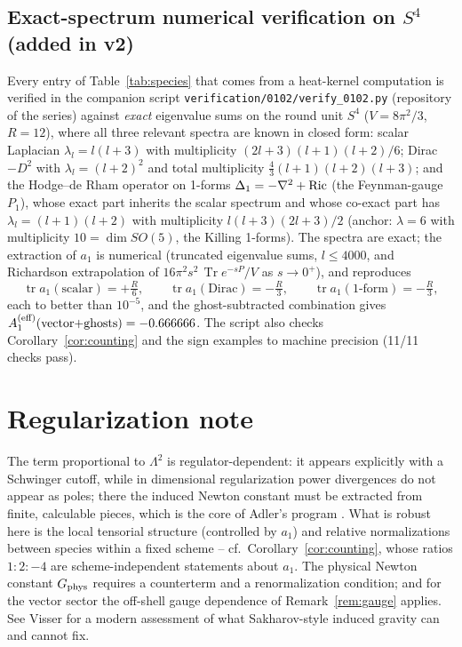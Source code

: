 \documentclass[11pt]{article}
\newcommand{\tr}{\operatorname{tr}}
\newcommand{\Tr}{\operatorname{Tr}}
\begin{document}
\subsection{Exact-spectrum numerical verification on $S^4$ (added in v2)}
\label{sec:verification}
Every entry of Table~\ref{tab:species} that comes from a heat-kernel
computation is verified in the companion script
\texttt{verification/0102/verify\_0102.py} (repository of the series) against
\emph{exact} eigenvalue sums on the round unit $S^4$
($V = 8\pi^2/3$, $R = 12$), where all three relevant spectra are known in
closed form: scalar Laplacian $\lambda_l = l(l+3)$ with multiplicity
$(2l+3)(l+1)(l+2)/6$; Dirac $-D^2$ with $\lambda_l = (l+2)^2$ and total
multiplicity $\tfrac43 (l+1)(l+2)(l+3)$; and the Hodge--de Rham operator on
1-forms $\Delta_1 = -\nabla^2 + {\rm Ric}$ (the Feynman-gauge $P_1$), whose
exact part inherits the scalar spectrum and whose co-exact part has
$\lambda_l = (l+1)(l+2)$ with multiplicity $l(l+3)(2l+3)/2$ (anchor:
$\lambda = 6$ with multiplicity $10 = \dim SO(5)$, the Killing 1-forms).
The spectra are exact; the extraction of $a_1$ is numerical (truncated
eigenvalue sums, $l \le 4000$, and Richardson extrapolation of
$16\pi^2 s^2\, \Tr e^{-sP}/V$ as $s \to 0^+$), and reproduces
\[
\tr a_1(\text{scalar}) = +\tfrac{R}{6}, \qquad
\tr a_1(\text{Dirac}) = -\tfrac{R}{3}, \qquad
\tr a_1(\text{1-form}) = -\tfrac{R}{3},
\]
each to better than $10^{-5}$, and the ghost-subtracted combination gives
$A_1^{\rm (eff)}(\text{vector+ghosts}) = -0.666666$. The script also checks
Corollary~\ref{cor:counting} and the sign examples to machine precision
(11/11 checks pass).

\section{Regularization note}
The term proportional to $\Lambda^2$ is regulator-dependent: it appears
explicitly with a Schwinger cutoff, while in dimensional regularization power
divergences do not appear as poles; there the induced Newton constant must be
extracted from finite, calculable pieces, which is the core of Adler's
program \cite{Adler}. What is robust here is the local tensorial structure
(controlled by $a_1$) and relative normalizations between species within a
fixed scheme -- cf.\ Corollary~\ref{cor:counting}, whose ratios
$1 : 2 : -4$ are scheme-independent statements about $a_1$. The physical
Newton constant $G_{\rm phys}$ requires a counterterm and a renormalization
condition; and for the vector sector the off-shell gauge dependence of
Remark~\ref{rem:gauge} applies. See Visser \cite{Visser} for a modern
assessment of what Sakharov-style induced gravity \cite{Sakharov} can and
cannot fix.
\end{document}
